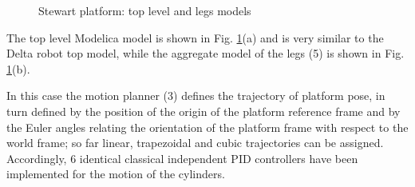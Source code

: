 \documentclass[]{interact}
\theoremstyle{plain}%
\theoremstyle{definition}
\theoremstyle{remark}
\begin{document}
\begin{figure}
{}
\caption{Stewart platform: top level and legs models} \label{Fig:Stewart_platform_Modelica_top_level}
\end{figure}
The top level Modelica model is shown in Fig. \ref{Fig:Stewart_platform_Modelica_top_level}(a) and is very similar to the Delta robot top model, while the aggregate model of the legs (5) is shown in Fig. \ref{Fig:Stewart_platform_Modelica_top_level}(b).

In this case the motion planner (3) defines the trajectory of platform pose, in turn defined by the position of the origin of the platform reference frame and by the Euler angles relating the orientation of the platform frame with respect to the world frame; so far linear, trapezoidal and cubic trajectories can be assigned. Accordingly, 6 identical classical independent PID controllers have been implemented for the motion of the cylinders.
\end{document}
